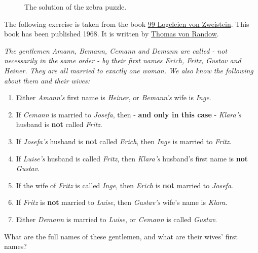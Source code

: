 \begin{figure}[!ht]
  \centering
  \caption{The solution of the zebra puzzle.}
  \label{fig:zebra}
\end{figure}


\pagebreak

\FloatBarrier

\exerciseEng
The following exercise is taken from the book 
\href{https://www.amazon.de/Logeleien-Zweistein-ihren-Antworten-Wegner/dp/B006YF0VUE}{99 Logeleien von Zweistein}.
This book has been published 1968.  It is written by 
\href{http://de.wikipedia.org/wiki/Thomas_von_Randow}{Thomas von Randow}.

\begin{minipage}{0.95\linewidth}
  {\sl
    The gentlemen \emph{Amann}, \emph{Bemann}, \emph{Cemann} and \emph{Demann} are called - not
    necessarily in the same order - by their 
    first names \emph{Erich}, \emph{Fritz}, \emph{Gustav} and \emph{Heiner}. They are all married to
    exactly one woman. We also know the following about them and their wives: 
    \begin{enumerate}
    \item Either \emph{Amann's} first name is \emph{Heiner}, or \emph{Bemann's} wife is \emph{Inge}.
    \item If \emph{Cemann} is married to \emph{Josefa}, then - \textbf{and only in this case} -
          \emph{Klara's} husband is \textbf{not} called \emph{Fritz}.
    \item If \emph{Josefa's} husband is \textbf{not} called \emph{Erich}, then \emph{Inge} is married to
          \emph{Fritz}. 
    \item If \emph{Luise's} husband is called \emph{Fritz}, then \emph{Klara's} husband's first name is
          \textbf{not} \emph{Gustav}. 
    \item If the wife of \emph{Fritz} is called \emph{Inge}, then \emph{Erich} is \textbf{not} married to
          \emph{Josefa}. 
    \item If \emph{Fritz} is \textbf{not} married to \emph{Luise}, then \emph{Gustav's} wife's name is \emph{Klara}.
    \item Either \emph{Demann} is married to \emph{Luise}, or \emph{Cemann} is called \emph{Gustav}.
    \end{enumerate}
    What are the full names of these gentlemen, and what are their wives' first names?}
\end{minipage}
\vspace*{0.3cm}

